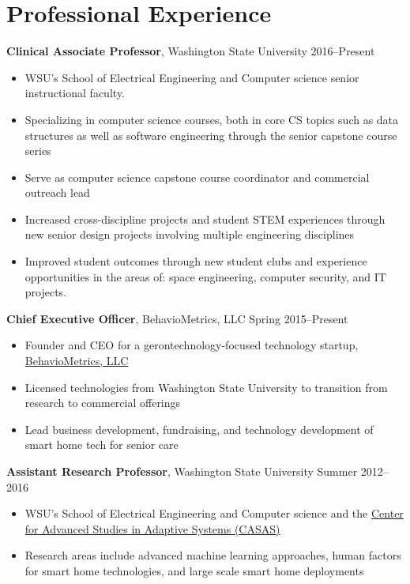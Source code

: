 \AOCLine
\section*{Professional Experience}
\label{sec:professionalexperience}

{\bf Clinical Associate Professor}, Washington State University \hfill 2016--Present
\begin{itemize}
	\item{WSU's School of Electrical Engineering and Computer science senior instructional faculty.}
    \item{Specializing in computer science courses, both in core CS topics such as data structures as well as software engineering through the senior capstone course series}
    \item{Serve as computer science capstone course coordinator and commercial outreach lead}
    \item{Increased cross-discipline projects and student STEM experiences through new senior design projects involving multiple engineering disciplines}
    \item{Improved student outcomes through new student clubs and experience opportunities in the areas of: space engineering, computer security, and IT projects.}
\end{itemize}

{\bf Chief Executive Officer}, BehavioMetrics, LLC \hfill Spring 2015--Present
\begin{itemize}
	\item{Founder and CEO for a gerontechnology-focused technology startup, \href{http://behaviometrics.io}{BehavioMetrics, LLC}}
	\item{Licensed technologies from Washington State University to transition from research to commercial offerings}
	\item{Lead business development, fundraising, and technology development of smart home tech for senior care}
\end{itemize}

{\bf Assistant Research Professor}, Washington State University \hfill Summer 2012--2016
\begin{itemize}
	\item{WSU's School of Electrical Engineering and Computer science and the \href{http://casas.wsu.edu}{Center for Advanced Studies in Adaptive Systems (CASAS)}}
	\item{Research areas include advanced machine learning approaches, human factors for smart home technologies, and large scale smart home deployments}
\end{itemize}

